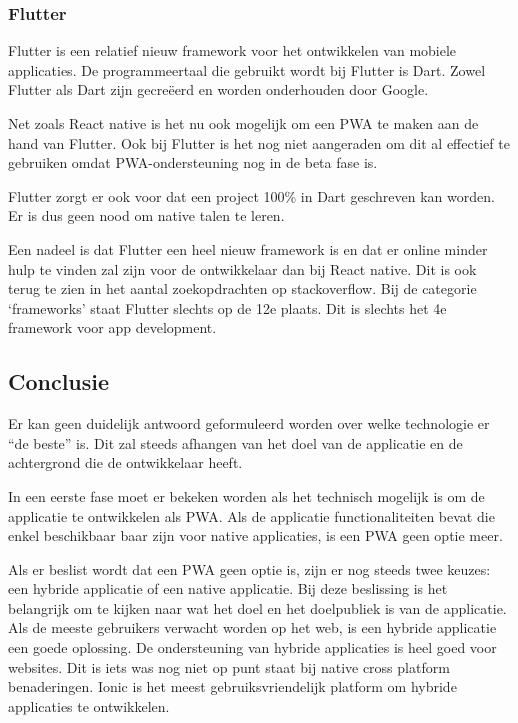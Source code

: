 	\subsubsection{Flutter}
		Flutter \autocite{Flutter2020} is een relatief nieuw framework voor het ontwikkelen van mobiele applicaties. De programmeertaal die gebruikt wordt bij Flutter is Dart. Zowel Flutter als Dart zijn gecreëerd en worden onderhouden door Google. 
		
		Net zoals React native is het nu ook mogelijk om een PWA te maken aan de hand van Flutter. Ook bij Flutter is het nog niet aangeraden om dit al effectief te gebruiken omdat PWA-ondersteuning nog in de beta fase is. 
		
		Flutter zorgt er ook voor dat een project 100\% in Dart geschreven kan worden. Er is dus geen nood om native talen te leren. 
		
		Een nadeel is dat Flutter een heel nieuw framework is en dat er online minder hulp te vinden zal zijn voor de ontwikkelaar dan bij React native. Dit is ook terug te zien in het aantal zoekopdrachten op stackoverflow. Bij de categorie ‘frameworks’ staat Flutter slechts op de 12e plaats. Dit is slechts het 4e framework voor app development.
		\autocite{StackOverflow2020}
		
\subsection{Conclusie}

Er kan geen duidelijk antwoord geformuleerd worden over welke technologie er “de beste” is. Dit zal steeds afhangen van het doel van de applicatie en de achtergrond die de ontwikkelaar heeft.


In een eerste fase moet er  bekeken worden als het technisch mogelijk is om de applicatie te ontwikkelen als PWA. Als de applicatie functionaliteiten bevat die enkel beschikbaar baar zijn voor native applicaties, is een PWA geen optie meer.

Als er beslist wordt dat een PWA geen optie is, zijn er nog steeds twee keuzes: een hybride applicatie of een native applicatie. Bij deze beslissing is het belangrijk om te kijken naar wat het doel en het doelpubliek is van de applicatie. Als de meeste gebruikers verwacht worden op het web, is een hybride applicatie een goede oplossing. De ondersteuning van hybride applicaties is heel goed voor websites. Dit is iets was nog niet op punt staat bij native cross platform benaderingen. Ionic is het meest gebruiksvriendelijk platform om hybride applicaties te ontwikkelen.

